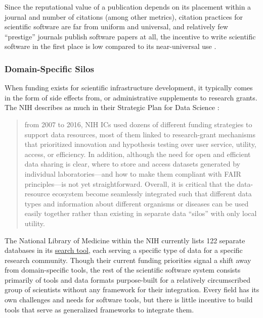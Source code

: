 \documentclass[10pt]{article}
\begin{document}
\begin{multicols}{2}
Since the reputational value of a publication depends on its placement
within a journal and number of citations (among other metrics), citation
practices for scientific software are far from uniform and universal,
and relatively few ``prestige'' journals publish software papers at all,
the incentive to write scientific software in the first place is low
compared to its near-universal use \cite{howisonSoftwareScientificLiterature2016} .

\hypertarget{domain-specific-silos}{%
\subsubsection{Domain-Specific Silos}\label{domain-specific-silos}}

When funding exists for scientific infrastructure development, it
typically comes in the form of side effects from, or administrative
supplements to research grants. The NIH describes as much in their
Strategic Plan for Data Science \cite{NIHStrategicPlan2018} :

\begin{quote}
from 2007 to 2016, NIH ICs used dozens of different funding strategies
to support data resources, most of them linked to research-grant
mechanisms that prioritized innovation and hypothesis testing over user
service, utility, access, or efficiency. In addition, although the need
for open and efficient data sharing is clear, where to store and access
datasets generated by individual laboratories---and how to make them
compliant with FAIR principles---is not yet straightforward. Overall, it
is critical that the data-resource ecosystem become seamlessly
integrated such that different data types and information about
different organisms or diseases can be used easily together rather than
existing in separate data ``silos'' with only local utility.
\end{quote}

The National Library of Medicine within the NIH currently lists 122
separate databases in its
\href{https://eresources.nlm.nih.gov/nlm_eresources/}{search tool}, each
serving a specific type of data for a specific research community.
Though their current funding priorities signal a shift away from
domain-specific tools, the rest of the scientific software system
consists primarily of tools and data formats purpose-built for a
relatively circumscribed group of scientists without any framework for
their integration. Every field has its own challenges and needs for
software tools, but there is little incentive to build tools that serve
as generalized frameworks to integrate them.


\end{multicols}
\end{document}
